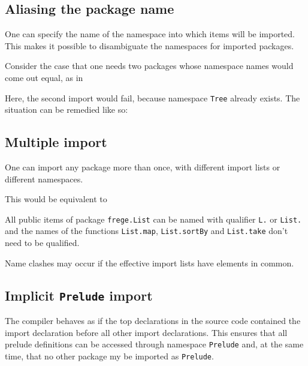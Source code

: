\subsection{Aliasing the package name}
One can specify the name of the namespace into which
items will be imported. This makes it possible to disambiguate the
namespaces for imported packages.

Consider the case that one needs two packages whose namespace names would come out equal, as in


Here, the second import would fail, because namespace \texttt{Tree} already
exists. The situation can be remedied like so:


\subsection{Multiple import}
One can import any package more than once, with different import
lists or different namespaces. 


This would be equivalent to 


All public items of package \texttt{frege.List} can be named with qualifier \texttt{L.} or \texttt{List.} 
and the names of the functions \texttt{List.map},  \texttt{List.sortBy} and  \texttt{List.take} don't need to be qualified.

Name clashes may occur if the effective import lists have elements in common. 

\subsection{Implicit \texttt{Prelude} import}
The compiler behaves as if the top declarations in
the source code contained the import declaration
before all other import declarations.
This ensures that all prelude definitions can be accessed through
namespace \texttt{Prelude} and, at the same time, that no other package my be imported as {\tt Prelude}.

